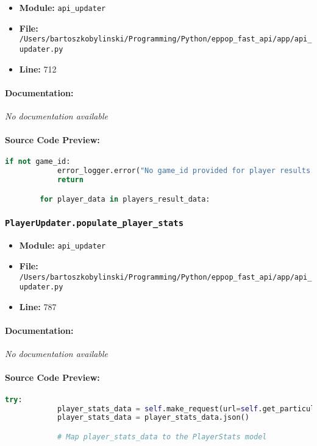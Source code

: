 \documentclass[11pt,a4paper]{article}
\begin{document}
\begin{itemize}
    \item \textbf{Module:} \texttt{api\_updater}
    \item \textbf{File:} \texttt{/Users/bartoszkobylinski/Programming/Python/eppop\_fast\_api/app/api\_updater.py}
    \item \textbf{Line:} 712
\end{itemize}

\paragraph{Documentation:} \textit{No documentation available}

\paragraph{Source Code Preview:}
\begin{lstlisting}[language=Python]
        if not game_id:
            error_logger.error("No game_id provided for player results.")
            return

        for player_data in players_result_data:
\end{lstlisting}

\vspace{1em}
\subsubsection{\texttt{PlayerUpdater.populate\_player\_stats}}

\begin{itemize}
    \item \textbf{Module:} \texttt{api\_updater}
    \item \textbf{File:} \texttt{/Users/bartoszkobylinski/Programming/Python/eppop\_fast\_api/app/api\_updater.py}
    \item \textbf{Line:} 787
\end{itemize}

\paragraph{Documentation:} \textit{No documentation available}

\paragraph{Source Code Preview:}
\begin{lstlisting}[language=Python]
        try:
            player_stats_data = self.make_request(url=self.get_particular_player_stats_url(player_id=player_id))
            player_stats_data = player_stats_data.json()

            # Map player_stats_data to the PlayerStats model
\end{lstlisting}
\end{document}
